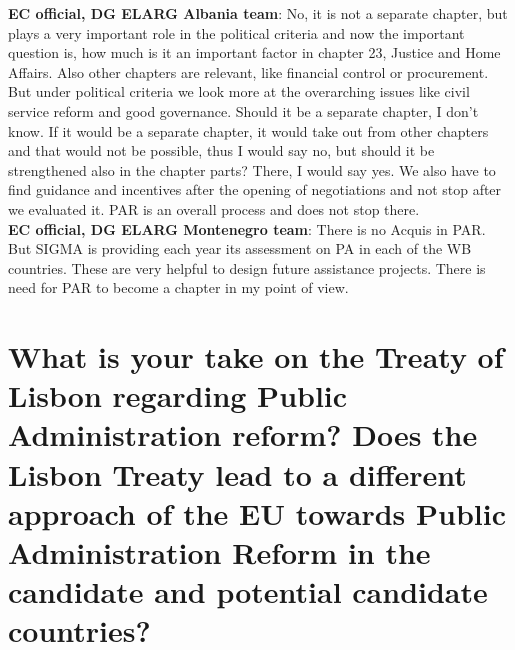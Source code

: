 \textbf{EC official, DG ELARG Albania team}: No, it is not a separate chapter, but plays a very important role in the political criteria and now the important question is, how much is it an important factor in chapter 23, Justice and Home Affairs. Also other chapters are relevant, like financial control or procurement. But under political criteria we look more at the overarching issues like civil service reform and good governance. Should it be a separate chapter, I don't know. If it would be a separate chapter, it would take out from other chapters and that would not be possible, thus I would say no, but should it be strengthened also in the chapter parts? There, I would say yes. We also have to find guidance and incentives after the opening of negotiations and not stop after we evaluated it. PAR is an overall process and does not stop there. \\
\textbf{EC official, DG ELARG Montenegro team}: There is no Acquis in PAR. But SIGMA is providing each year its assessment on PA in each of the WB countries. These are very helpful to design future assistance projects. There is need for PAR to become a chapter in my point of view.\\
\section{What is your take on the Treaty of Lisbon regarding Public Administration reform? Does the Lisbon Treaty lead to a different approach of the EU towards Public Administration Reform in the candidate and potential candidate countries?}
\label{sec:countries1}

